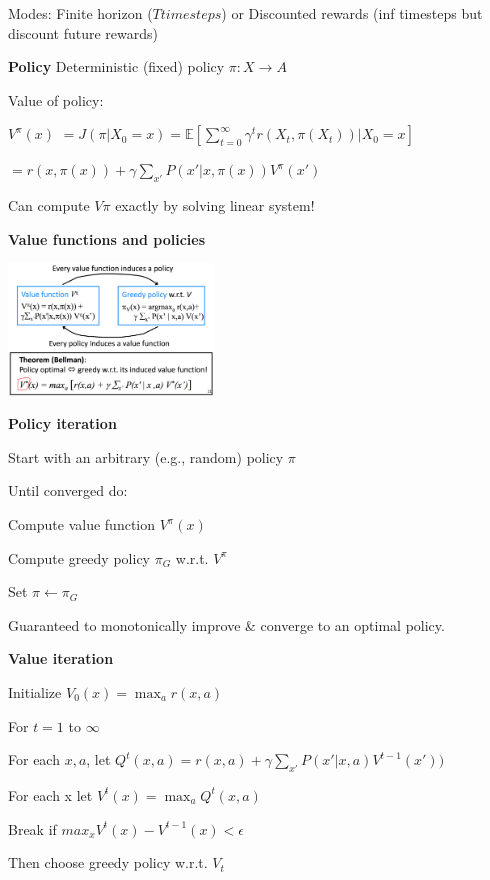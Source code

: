 \documentclass[a4paper, 11pt, landscape]{article}
\begin{document}
\begin{multicols*}{3}
\begin{compactitem}
	Modes: Finite horizon ($T timesteps$) or Discounted rewards (inf timesteps but discount future rewards)
\end{compactitem}

\textbf{Policy}
Deterministic (fixed) policy $\pi: X \rightarrow A$

Value of policy: 

$V^\pi(x)$ $= J(\pi | X_0 = x) $$= \mathds{E}[\sum_{t=0}^{\infty} \gamma^t r(X_t, \pi(X_t)) | X_0 = x] $

$= r(x, \pi(x)) + \gamma \sum_{x'} P(x' | x, \pi(x)) V^\pi(x')$

Can compute $V\pi$ exactly by solving linear system! 

\textbf{Value functions and policies}


\includegraphics[height=3.5cm]{img/pai5.png}

\textbf{Policy iteration}
\begin{compactitem}
	\item Start with an arbitrary (e.g., random) policy $\pi$
	\item Until converged do:
	\item Compute value function $V^\pi(x)$
	\item Compute greedy policy $\pi_G$ w.r.t. $V^\pi$
	\item Set $\pi \leftarrow \pi_G$
\end{compactitem}

Guaranteed to monotonically improve \& converge to an optimal policy.

\textbf{Value iteration}
\begin{compactitem}
\item Initialize $V_0(x) = \max_a r(x, a)$
\item For $t=1$ to $\infty$ 
\item For each $x, a$, let $Q^t(x,a) = r(x, a) + \gamma \sum_{x'} P(x' | x, a) V^{t-1}(x'))$
\item For each x let $V^t(x) = \max_a Q^t(x,a)$
\item Break if $max_x V^t(x) - V^{t-1}(x) < \epsilon$
\item Then choose greedy policy w.r.t. $V_t$
\end{compactitem}


\end{multicols*}
\end{document}
